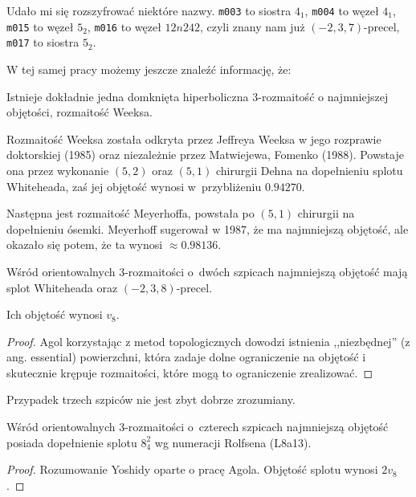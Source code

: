 Udało mi się rozszyfrować niektóre nazwy.
\texttt{m003} to siostra $4_1$, %
\texttt{m004} to węzeł $4_1$, %
\texttt{m015} to węzeł $5_2$,
\texttt{m016} to węzeł $12n242$, czyli znany nam już $(-2, 3, 7)$-precel,
%
\texttt{m017} to siostra $5_2$. %

W tej samej pracy możemy jeszcze znaleźć informację, że:

\begin{proposition}
    Istnieje dokładnie jedna domknięta hiperboliczna 3-rozmaitość o najmniejszej objętości, rozmaitość Weeksa.
\end{proposition}

Rozmaitość Weeksa została odkryta przez Jeffreya Weeksa w jego rozprawie doktorskiej (1985) oraz niezależnie przez Matwiejewa, Fomenko (1988).
Powstaje ona przez wykonanie $(5, 2)$ oraz $(5, 1)$ chirurgii Dehna na dopełnieniu splotu Whiteheada, zaś jej objętość wynosi w~przybliżeniu $0.94270$. %

Następna jest rozmaitość Meyerhoffa, powstała po $(5, 1)$ chirurgii na dopełnieniu ósemki.
Meyerhoff sugerował w 1987, że ma najmniejszą objętość, ale okazało się potem, że ta wynosi $\approx 0.98136$.

\begin{proposition}
    Wśród orientowalnych 3-rozmaitości o~dwóch szpicach najmniejszą objętość mają splot Whiteheada oraz $(-2, 3, 8)$-precel.
%
%
\end{proposition}


Ich objętość wynosi $v_8$.

\begin{proof}
    Agol \cite{agol10} korzystając z metod topologicznych dowodzi istnienia ,,niezbędnej'' (z ang. essential) powierzchni, która zadaje dolne ograniczenie na objętość i skutecznie krępuje rozmaitości, które mogą to ograniczenie zrealizować.
\end{proof}

Przypadek trzech szpiców nie jest zbyt dobrze zrozumiany.

\begin{proposition}
    Wśród orientowalnych 3-rozmaitości o~czterech szpicach najmniejszą objętość posiada dopełnienie splotu $8_4^2$ wg numeracji Rolfsena (L8a13).
\end{proposition}

\begin{proof}
    Rozumowanie Yoshidy \cite{yoshida13} oparte o pracę Agola.
    Objętość splotu wynosi $2v_8$.
\end{proof}




